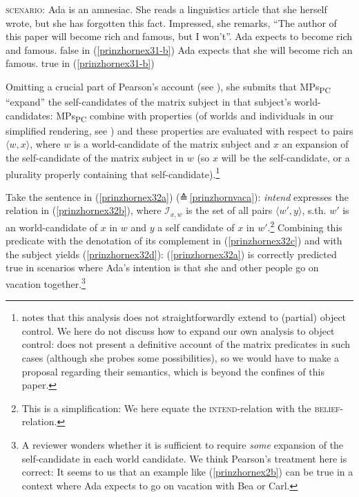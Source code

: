 \documentclass[output=paper,colorlinks,citecolor=brown,
]{langscibook}
\begin{document}
\ea 
\ea  \textsc{scenario:} Ada is an amnesiac. She reads a linguistics article that she herself wrote, but she has forgotten this fact. Impressed, she remarks, “The author of this paper will become rich and famous, but I won't”. \label{prinzhornex31-b}
\ex Ada expects to become rich and famous. \hfill {false} in (\ref{prinzhornex31-b}) \label{prinzhornex31-c}
\ex Ada expects that she will become rich an famous.  \hfill {true} in (\ref{prinzhornex31-b})
\newline \phantom{.}\hfill \citep[cf.][(9)]{Pearson:2016} \label{prinzhornex31-d}
\z\z 

Omitting a crucial part of Pearson's account (see ), she submits that MPs\textsubscript{PC} “expand” the self-candidates of the matrix subject in that subject's world-can\-di\-dates: MPs\textsubscript{PC} combine with properties (of worlds and individuals in our simplified rendering, see \citealt{Chierchia:1989}) and these properties are evaluated with respect to pairs $\langle w, x \rangle$, where $w$ is a world-candidate of the matrix subject and $x$ an expansion of the self-candidate of the matrix subject in $w$ (so $x$ will be the self-candidate, or a plurality properly containing that self-candidate).\footnote{\citet{Pearson:2016} notes that this analysis does not straightforwardly extend to (partial) object control. We here do not discuss how to expand our own analysis to object control: \citet{Pearson:2016} does not present a definitive account of the matrix predicates in such cases (although she probes some possibilities), so we would have to make a proposal regarding their semantics, which is beyond the confines of this paper.}

Take the sentence in (\ref{prinzhornex32a}) (≙\,\ref{prinzhornvaca}): \textit{intend} expresses the relation in (\ref{prinzhornex32b}), where  $\mathcal{I}_{x,w}$ is the set of all pairs $\langle w',y \rangle$, s.th. $w'$ is an world-candidate of $x$ in $w$ and $y$ a self candidate of $x$ in $w'$.\footnote{This is a simplification: We here equate the \textsc{intend}-relation with the \textsc{belief}-relation.} Combining this predicate with the denotation of its complement in (\ref{prinzhornex32c}) and with the subject yields (\ref{prinzhornex32d}): (\ref{prinzhornex32a}) is correctly predicted true in scenarios where Ada's intention is that she and other people  go on vacation together.\footnote{A reviewer wonders whether it is sufficient to require \textit{some} expansion of the self-candidate in each world candidate. We think Pearson's treatment here is correct: It seems to us that an example like (\ref{prinzhornex2b}) can be true in a context where Ada expects to go on vacation with Bea or Carl.}
\end{document}
